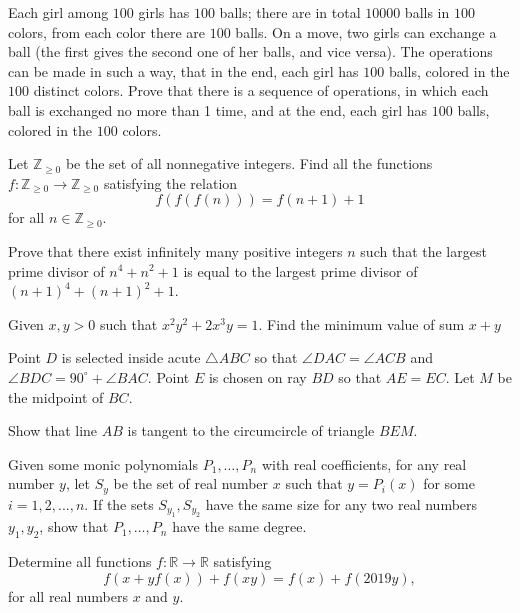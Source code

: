 \documentclass[11pt]{scrartcl}
\begin{document}
\begin{problem}[969197144236847]
	Each girl among $100$ girls has $100$ balls; there are in total $10000$ balls in $100$ colors, from each color there are $100$ balls. On a move, two girls can exchange a ball (the first gives the second one of her balls, and vice versa). The operations can be made in such a way, that in the end, each girl has $100$ balls, colored in the $100$ distinct colors. Prove that there is a sequence of operations, in which each ball is exchanged no more than 1 time, and at the end, each girl has $100$ balls, colored in the $100$ colors.
\end{problem}
\begin{problem}[973095234047520]
	Let $\mathbb{Z}_{\ge 0}$ be the set of all nonnegative integers. Find all the functions $f: \mathbb{Z}_{\ge 0} \rightarrow \mathbb{Z}_{\ge 0} $ satisfying the relation
\[ f(f(f(n))) = f(n+1 ) +1 \]
for all $ n\in \mathbb{Z}_{\ge 0}$.
\end{problem}
\begin{problem}[973663451075571]
	Prove that there exist infinitely many positive integers $n$ such that the largest prime divisor of $n^4 + n^2 + 1$ is equal to the largest prime divisor of $(n+1)^4 + (n+1)^2 +1$.
\end{problem}
\begin{problem}[977220304994418]
Given $x,y>0$ such that $x^2y^2+2x^3y=1$. Find the minimum value of sum $x+y$
\end{problem}
\begin{problem}[978369715927760]
Point $D$ is selected inside acute $\triangle ABC$ so that $\angle DAC = \angle ACB$ and $\angle BDC = 90^{\circ} + \angle BAC$. Point $E$ is chosen on ray $BD$ so that $AE = EC$. Let $M$ be the midpoint of $BC$.

Show that line $AB$ is tangent to the circumcircle of triangle $BEM$.
\end{problem}
\begin{problem}[988108242834730]
Given some monic polynomials $P_1, \ldots, P_n$ with real coefficients, for any real number $y$, let $S_y$ be the set of real number $x$ such that $y = P_i(x)$ for some $i = 1, 2, ..., n$. If the sets $S_{y_1}, S_{y_2}$ have the same size for any two real numbers $y_1, y_2$, show that $P_1, \ldots, P_n$ have the same degree.
\end{problem}
\begin{problem}[988671418474826]
	Determine all functions $f: \mathbb{R} \to \mathbb{R}$ satisfying
\[f(x + yf(x)) + f(xy) = f(x) + f(2019y),\]for all real numbers $x$ and $y$.
\end{problem}
\end{document}
